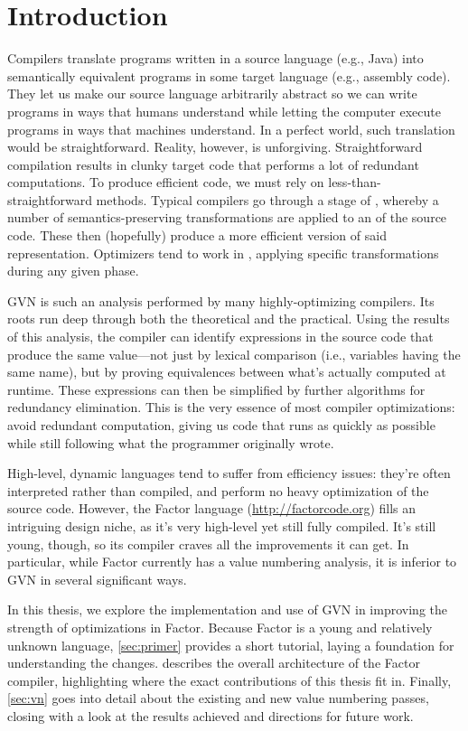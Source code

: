 \section{Introduction}\label{sec:intro}

Compilers translate programs written in a source language (e.g., Java) into
semantically equivalent programs in some target language (e.g., assembly code).
They let us make our source language arbitrarily abstract so we can write
programs in ways that humans understand while letting the computer execute
programs in ways that machines understand.  In a perfect world, such
translation would be straightforward.  Reality, however, is unforgiving.
Straightforward compilation results in clunky target code that performs a lot
of redundant computations.  To produce efficient code, we must rely on
less-than-straightforward methods.  Typical compilers go through a stage of
, whereby a number of semantics-preserving transformations
are applied to an  of the source code.  These then
(hopefully) produce a more efficient version of said representation.
Optimizers tend to work in , applying specific transformations
during any given phase.

\Gls{GVN} is such an analysis performed by many highly-optimizing compilers.
Its roots run deep through both the theoretical and the practical.  Using the
results of this analysis, the compiler can identify expressions in the source
code that produce the same value---not just by lexical comparison (i.e.,
variables having the same name), but by proving equivalences between what's
actually computed at runtime.  These expressions can then be simplified by
further algorithms for redundancy elimination.  This is the very essence of
most compiler optimizations: avoid redundant computation, giving us code that
runs as quickly as possible while still following what the programmer
originally wrote.

High-level, dynamic languages tend to suffer from efficiency issues: they're
often interpreted rather than compiled, and perform no heavy optimization of
the source code.  However, the Factor language (\url{http://factorcode.org})
fills an intriguing design niche, as it's very high-level yet still fully
compiled.  It's still young, though, so its compiler craves all the
improvements it can get.  In particular, while Factor currently has a
 value numbering analysis, it is inferior to \gls{GVN} in several
significant ways.

In this thesis, we explore the implementation and use of \gls{GVN} in improving
the strength of optimizations in Factor.  Because Factor is a young and
relatively unknown language, \cref{sec:primer} provides a short tutorial,
laying a foundation for understanding the changes.  
describes the overall architecture of the Factor compiler, highlighting where
the exact contributions of this thesis fit in.  Finally, \cref{sec:vn} goes
into detail about the existing and new value numbering passes, closing with a
look at the results achieved and directions for future work. 

